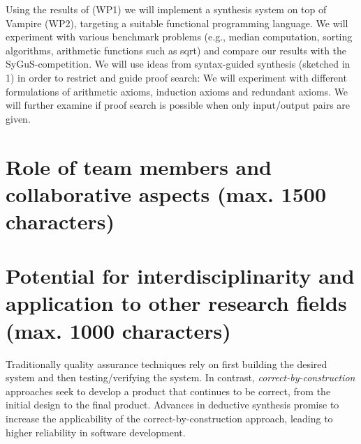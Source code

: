 \documentclass[a4paper,12pt]{article}
\begin{document}
Using the results of (WP1) we will implement a synthesis system on top of Vampire (WP2), targeting a suitable functional programming language.
We will experiment with various benchmark problems (e.g., median computation, sorting algorithms, arithmetic functions such as sqrt) and compare our results with the SyGuS-competition.
We will use ideas from syntax-guided synthesis (sketched in 1) in order to restrict and guide proof search:
We will experiment with different formulations of arithmetic axioms, induction axioms and redundant axioms.
We will further examine if proof search is possible when only input/output pairs are given.
	
\section{Role of team members and collaborative aspects (max. 1500 characters)}

\section{Potential for interdisciplinarity and application to other research fields (max. 1000 characters)}


Traditionally quality assurance techniques rely on first building the desired system and then testing/verifying the system.
In contrast, \emph{correct-by-construction} approaches seek to develop a product that continues to be correct, from the initial design to the final product.
Advances in deductive synthesis promise to increase the applicability of the correct-by-construction approach, leading to higher reliability in software development.
\end{document}
